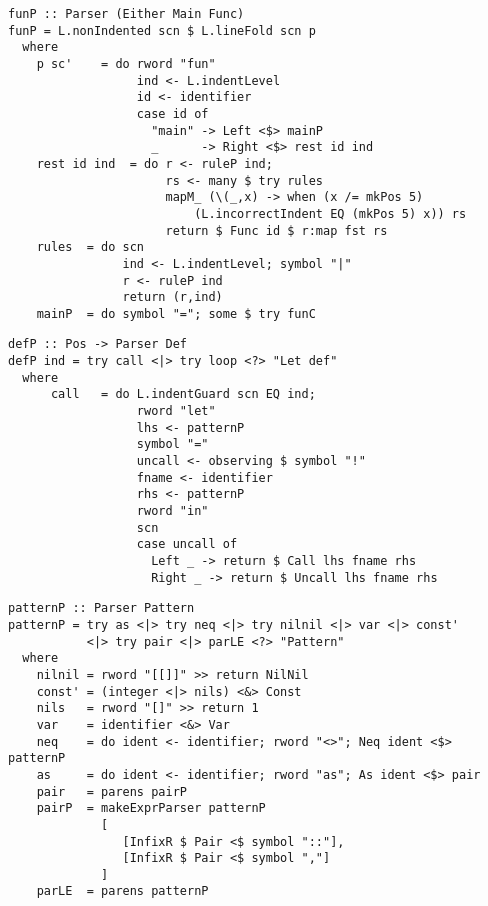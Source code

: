 \documentclass[a4paper]{article}
\begin{document}


\appendix
\begin{verbatim}
funP :: Parser (Either Main Func)
funP = L.nonIndented scn $ L.lineFold scn p
  where
    p sc'    = do rword "fun"
                  ind <- L.indentLevel
                  id <- identifier
                  case id of
                    "main" -> Left <$> mainP
                    _      -> Right <$> rest id ind
    rest id ind  = do r <- ruleP ind;
                      rs <- many $ try rules
                      mapM_ (\(_,x) -> when (x /= mkPos 5)
                          (L.incorrectIndent EQ (mkPos 5) x)) rs
                      return $ Func id $ r:map fst rs
    rules  = do scn
                ind <- L.indentLevel; symbol "|"
                r <- ruleP ind
                return (r,ind)
    mainP  = do symbol "="; some $ try funC
\end{verbatim}
\begin{verbatim}
defP :: Pos -> Parser Def
defP ind = try call <|> try loop <?> "Let def"
  where
      call   = do L.indentGuard scn EQ ind;
                  rword "let"
                  lhs <- patternP
                  symbol "="
                  uncall <- observing $ symbol "!"
                  fname <- identifier
                  rhs <- patternP
                  rword "in"
                  scn
                  case uncall of
                    Left _ -> return $ Call lhs fname rhs
                    Right _ -> return $ Uncall lhs fname rhs
\end{verbatim}
\begin{verbatim}
patternP :: Parser Pattern
patternP = try as <|> try neq <|> try nilnil <|> var <|> const'
           <|> try pair <|> parLE <?> "Pattern"
  where
    nilnil = rword "[[]]" >> return NilNil
    const' = (integer <|> nils) <&> Const
    nils   = rword "[]" >> return 1
    var    = identifier <&> Var
    neq    = do ident <- identifier; rword "<>"; Neq ident <$> patternP
    as     = do ident <- identifier; rword "as"; As ident <$> pair
    pair   = parens pairP
    pairP  = makeExprParser patternP
             [
                [InfixR $ Pair <$ symbol "::"],
                [InfixR $ Pair <$ symbol ","]
             ]
    parLE  = parens patternP
\end{verbatim}
\end{document}

